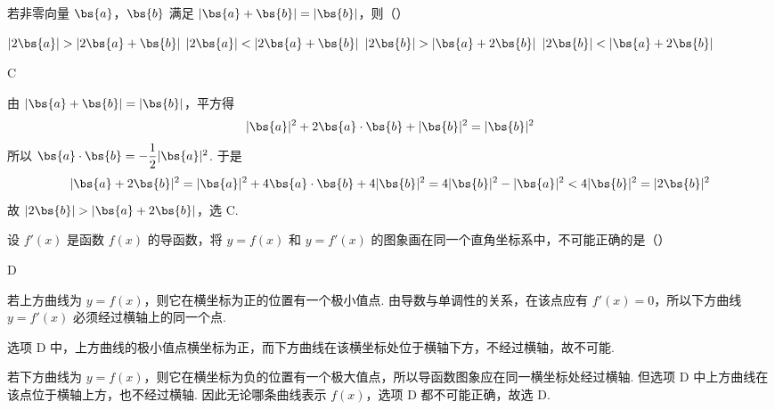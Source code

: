 \begin{problem}
若非零向量 \(\bs{a}\)，\(\bs{b}\) 满足 \(|\bs{a} + \bs{b}| = |\bs{b}|\)，则（\quad）

\choices
    {\(|2\bs{a}| > |2\bs{a} + \bs{b}|\)}
    {\(|2\bs{a}| < |2\bs{a} + \bs{b}|\)}
    {\(|2\bs{b}| > |\bs{a} + 2\bs{b}|\)}
    {\(|2\bs{b}| < |\bs{a} + 2\bs{b}|\)}
\begin{answer}
C
\end{answer}

\begin{solution}
由 \(\lvert\bs{a}+\bs{b}\rvert=\lvert\bs{b}\rvert\)，平方得
\[
\lvert\bs{a}\rvert^2+2\bs{a}\cdot\bs{b}+\lvert\bs{b}\rvert^2=\lvert\bs{b}\rvert^2
\]
所以 \(\bs{a}\cdot\bs{b}=-\dfrac12\lvert\bs{a}\rvert^2\). 于是
\[
\lvert\bs{a}+2\bs{b}\rvert^2
=\lvert\bs{a}\rvert^2+4\bs{a}\cdot\bs{b}+4\lvert\bs{b}\rvert^2
=4\lvert\bs{b}\rvert^2-\lvert\bs{a}\rvert^2
<4\lvert\bs{b}\rvert^2=\lvert2\bs{b}\rvert^2
\]
故 \(\lvert2\bs{b}\rvert>\lvert\bs{a}+2\bs{b}\rvert\)，选 C.
\end{solution}
\end{problem}

\begin{problem}
设 \(f'(x)\) 是函数 \(f(x)\) 的导函数，将 \(y = f(x)\) 和 \(y = f'(x)\) 的图象画在同一个直角坐标系中，不可能正确的是（\quad）

    {}
    {}
    {}
\begin{answer}
D
\end{answer}

\begin{solution}
若上方曲线为 \(y=f(x)\)，则它在横坐标为正的位置有一个极小值点. 由导数与单调性的关系，在该点应有 \(f'(x)=0\)，所以下方曲线 \(y=f'(x)\) 必须经过横轴上的同一个点.

选项 D 中，上方曲线的极小值点横坐标为正，而下方曲线在该横坐标处位于横轴下方，不经过横轴，故不可能.

若下方曲线为 \(y=f(x)\)，则它在横坐标为负的位置有一个极大值点，所以导函数图象应在同一横坐标处经过横轴. 但选项 D 中上方曲线在该点位于横轴上方，也不经过横轴. 因此无论哪条曲线表示 \(f(x)\)，选项 D 都不可能正确，故选 D.
\end{solution}
\end{problem}

